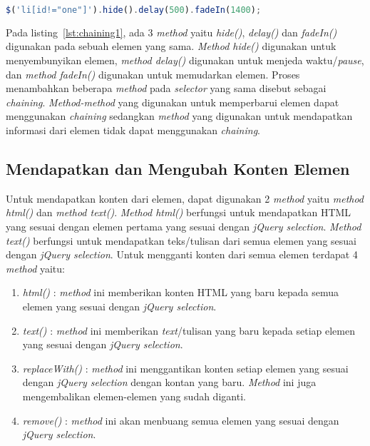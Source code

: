 \begin{lstlisting}[language=Javascript, caption=Menggunakan beberapa \textit{method} pada elemen yang sama, label={lst:chaining1}]
	$('li[id!="one"]').hide().delay(500).fadeIn(1400);
\end{lstlisting}

Pada listing~\ref{lst:chaining1}, ada 3 \textit{method} yaitu \textit{hide()}, \textit{delay()} dan \textit{fadeIn()} digunakan pada sebuah elemen yang sama. \textit{Method hide()} digunakan untuk menyembunyikan elemen, \textit{method delay()} digunakan untuk menjeda waktu/\textit{pause}, dan \textit{method fadeIn()} digunakan untuk memudarkan elemen. Proses menambahkan beberapa \textit{method} pada \textit{selector} yang sama disebut sebagai \textit{chaining}. \textit{Method-method} yang digunakan untuk memperbarui elemen dapat menggunakan \textit{chaining} sedangkan \textit{method} yang digunakan untuk mendapatkan informasi dari elemen tidak dapat menggunakan \textit{chaining}. 

\subsection{Mendapatkan dan Mengubah Konten Elemen}
Untuk mendapatkan konten dari elemen, dapat digunakan 2 \textit{method} yaitu \textit{method html()} dan \textit{method text()}. \textit{Method html()} berfungsi untuk mendapatkan HTML yang sesuai dengan elemen pertama yang sesuai dengan \textit{jQuery selection}. \textit{Method text()} berfungsi untuk mendapatkan teks/tulisan dari semua elemen yang sesuai dengan \textit{jQuery selection}. Untuk mengganti konten dari semua elemen terdapat 4 \textit{method} yaitu:

\begin{enumerate}
	\item \textit{html()} : \textit{method} ini memberikan konten HTML yang baru kepada semua elemen yang sesuai dengan \textit{jQuery selection}.
	\item \textit{text()} : \textit{method} ini memberikan \textit{text}/tulisan yang baru kepada setiap elemen yang sesuai dengan \textit{jQuery selection}.
	\item \textit{replaceWith()} : \textit{method} ini menggantikan konten setiap elemen yang sesuai dengan \textit{jQuery selection} dengan kontan yang baru. \textit{Method} ini juga mengembalikan elemen-elemen yang sudah diganti.
	\item \textit{remove()} : \textit{method} ini akan menbuang semua elemen yang sesuai dengan \textit{jQuery selection}.
\end{enumerate}


